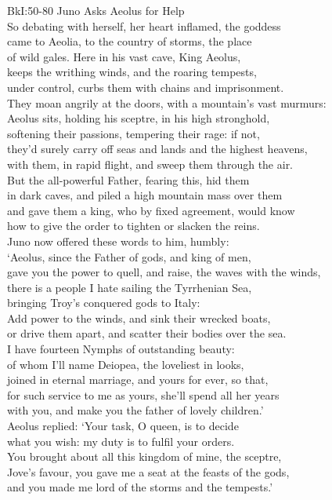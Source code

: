 \documentclass[10pt, a5paper, titlepage]{minimal}
\begin{document}
{BkI:50-80 Juno Asks Aeolus for Help}\\
So debating with herself, her heart inflamed, the goddess\\
came to Aeolia, to the country of storms, the place\\
of wild gales. Here in his vast cave, King Aeolus,\\
keeps the writhing winds, and the roaring tempests,\\
under control, curbs them with chains and imprisonment.\\
They moan angrily at the doors, with a mountain's vast murmurs:\\
Aeolus sits, holding his sceptre, in his high stronghold,\\
softening their passions, tempering their rage: if not,\\
they'd surely carry off seas and lands and the highest heavens,\\
with them, in rapid flight, and sweep them through the air.\\
But the all-powerful Father, fearing this, hid them\\
in dark caves, and piled a high mountain mass over them\\
and gave them a king, who by fixed agreement, would know\\
how to give the order to tighten or slacken the reins.\\
Juno now offered these words to him, humbly:\\
`Aeolus, since the Father of gods, and king of men,\\
gave you the power to quell, and raise, the waves with the winds,\\
there is a people I hate sailing the Tyrrhenian Sea,\\
bringing Troy's conquered gods to Italy:\\
Add power to the winds, and sink their wrecked boats,\\
or drive them apart, and scatter their bodies over the sea.\\
I have fourteen Nymphs of outstanding beauty:\\
of whom I'll name Deiopea, the loveliest in looks,\\
joined in eternal marriage, and yours for ever, so that,\\
for such service to me as yours, she'll spend all her years\\
with you, and make you the father of lovely children.'\\
Aeolus replied: `Your task, O queen, is to decide\\
what you wish: my duty is to fulfil your orders.\\
You brought about all this kingdom of mine, the sceptre,\\
Jove's favour, you gave me a seat at the feasts of the gods,\\
and you made me lord of the storms and the tempests.'
\end{document}
